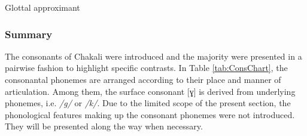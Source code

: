 \begin{table}[!htb] \small
\centering
\caption{Glottal  approximant\label{tab:glot-approx}}

\quad
{}
\end{table}





\subsubsection{Summary} 
\label{sec:sum-consonant}

The consonants of Chakali were introduced and the majority were
presented in a pairwise fashion to highlight specific contrasts. In Table
\ref{tab:ConsChart},  the  consonantal phonemes are arranged according to their
place and manner of articulation. Among them,  the surface consonant [ɣ] is 
derived from underlying phonemes, i.e. {\it /g/} or  {\it  /k/}.   Due to the
limited scope of the present section,  the phonological
features making up the consonant phonemes were not introduced. They will be
presented along the way
when necessary. 


